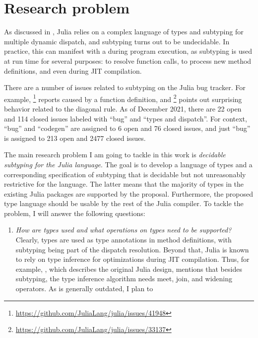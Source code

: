 \chapter{Research problem}

As discussed in , Julia relies on a complex language of types
and subtyping for multiple dynamic dispatch, and subtyping turns out to be
undecidable. In practice, this can manifest with a 
during program execution, as subtyping is used at run time for several purposes:
to resolve function calls, to process new method definitions, and even during
JIT compilation.

There are a number of issues related to subtyping on the Julia bug tracker.
For example,
\href{https://github.com/JuliaLang/julia/issues/41948}{}\footnote{
    \url{https://github.com/JuliaLang/julia/issues/41948}
} reports  caused by a function definition,
and
\href{https://github.com/JuliaLang/julia/issues/33137}{}\footnote{
    \url{https://github.com/JuliaLang/julia/issues/33137}
} points out surprising behavior related to the diagonal rule.
As of December 2021, there are 22 open and 114 closed issues labeled with ``bug''
and ``types and dispatch''. For context, ``bug'' and ``codegen'' are assigned to
6 open and 76 closed issues, and just ``bug'' is assigned to 213 open and 2477
closed issues.

The main research problem I am going to tackle in this work is
\emph{decidable subtyping for the Julia language}.
The goal is to develop a language of types and a corresponding specification
of subtyping that is decidable but not unreasonably restrictive for the language.
The latter means that the majority of types in the existing Julia packages
are supported by the proposal.
Furthermore, the proposed type language should be usable by the rest of the
Julia compiler.
To tackle the problem, I will answer the following questions:
\begin{enumerate}
    \item \emph{How are types used and what operations on types need to be supported?}
      Clearly, types are used as type annotations in method definitions, with
      subtyping being part of the dispatch resolution.
      Beyond that, Julia is known to rely on type inference for optimizations
      during JIT compilation. Thus, for example, \citet{TODO}, which describes the
      original Julia design, mentions that besides subtyping, the type inference
      algorithm needs meet, join, and widening operators.
      As \cite{TODO} is generally outdated, I plan to 
\end{enumerate}
